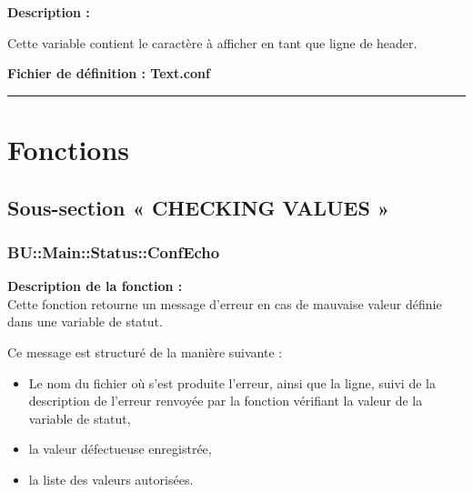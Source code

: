 \documentclass[a4paper,10pt]{article}
\begin{document}
\textbf{Description :}

\begin{justify}
    Cette variable contient le caractère à afficher en tant que ligne de header.
\end{justify}

\textbf{Fichier de définition : \color{lime}Text.conf}\\[1\baselineskip]





\color{sec1}\par\noindent\rule{\textwidth}{0.4pt}\color{text}

\color{sec1}
\section{Fonctions}\color{text}

\color{sec2}
\subsection{Sous-section « CHECKING VALUES »}

\color{sec3}
\subsubsection{BU::Main::Status::ConfEcho}\color{text}

\begin{justify}
\textbf{Description de la fonction :}\\[1\baselineskip]
    Cette fonction retourne un message d'erreur en cas de mauvaise valeur définie dans une variable de statut.
\end{justify}

\begin{justify}
   	Ce message est structuré de la manière suivante :

   	\begin{itemize}
   		\item Le nom du fichier où s'est produite l'erreur, ainsi que la ligne, suivi de la description de l'erreur renvoyée par la fonction vérifiant la valeur de la variable de statut,\setlength{\parskip}{1em}

   		\item la valeur défectueuse enregistrée,

   		\item la liste des valeurs autorisées.
   	\end{itemize}
\end{justify}
\end{document}
